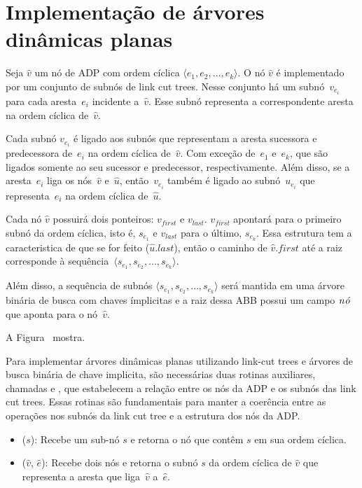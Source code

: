 \section{Implementação de árvores dinâmicas planas}


Seja $\hat v$ um nó de ADP com ordem cíclica $\langle e_1, e_2, \ldots, e_k\rangle$.
O nó $\hat v$ é implementado por um conjunto de subnós de link cut trees.
Nesse conjunto há um subnó~$v_{e_i}$ para cada aresta~$e_i$ incidente a~$\hat v$.
Esse subnó representa a correspondente aresta na ordem cíclica de~$\hat v$.

Cada subnó $v_{e_i}$ é ligado aos subnós que representam a aresta sucessora e predecessora de~$e_i$ na ordem cíclica de~$\hat v$.
Com exceção de~$e_1$ e~$e_k$, que são ligados somente ao seu sucessor e predecessor, respectivamente.
Além disso, se a aresta~$e_i$ liga os nós~$\hat v$ e~$\hat u$, então~$v_{e_i}$ também é ligado ao subnó~$u_{e_i}$ que representa~$e_i$ na ordem cíclica de~$\hat u$.

Cada nó $\hat v$ possuirá dois ponteiros: $v_{first}$ e $v_{last}$.
$v_{first}$ apontará para o primeiro subnó da ordem cíclica, isto é, $s_{e_1}$ e $v_{last}$ para o último, $s_{e_k}$.
Essa estrutura tem a caracteristica de que se for feito \linkcutEvert($\hat u$.$last$), então o caminho de $\hat v$.$first$ até a raiz corresponde à sequência~$\langle s_{e_1}, s_{e_2}, \ldots, s_{e_k}\rangle$.

Além disso, a sequência de subnós $\langle s_{e_1}, s_{e_2}, \ldots, s_{e_k}\rangle$ será mantida em uma árvore binária de busca com chaves ímplicitas e a raiz dessa ABB possui um campo $\mathit{n\acute{o}}$ que aponta para o nó~$\hat v$.

A Figura~ mostra.

Para implementar árvores dinâmicas planas utilizando link-cut trees e árvores de busca binária de chave implicita, são necessárias duas rotinas auxiliares, chamadas \LCOFindNode{} e \LCOFindSubNode{}, que estabelecem a relação entre os nós da ADP e os subnós das link cut trees.
Essas rotinas são fundamentais para manter a coerência entre as operações nos subnós da link cut tree e a estrutura dos nós da ADP.

\begin{itemize}
\item \LCOFindNode($s$): Recebe um sub-nó $s$ e retorna o nó que contêm $s$ em sua ordem cíclica.
\item \LCOFindSubNode($\hat v$, $\hat e$): Recebe dois nós e retorna o subnó $s$ da ordem cíclica de $\hat v$ que representa a aresta que liga~$\hat v$ a~$\hat e$.
\end{itemize}


